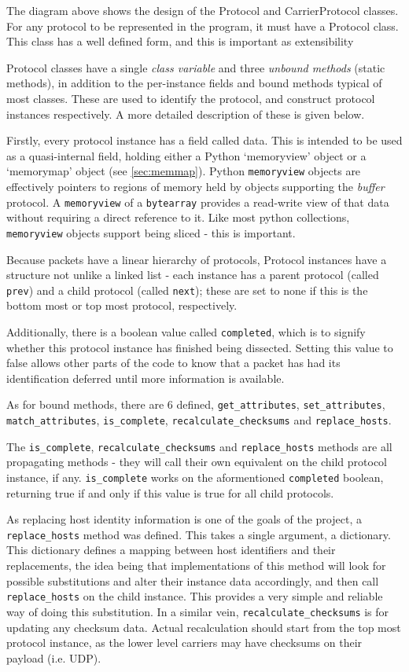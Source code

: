 \documentclass[10pt,a4paper,notitlepage,twoside]{report}
\begin{document}
The diagram above shows the design of the Protocol and CarrierProtocol classes. For any protocol to be represented in the program, it must have a Protocol class. This class has a well defined form, and this is important as extensibility 

Protocol classes have a single \emph{class variable} and three \emph{unbound methods} (static methods), in addition to the per-instance fields and bound methods typical of most classes. These are used to identify the protocol, and construct protocol instances respectively. A more detailed description of these is given below.

Firstly, every protocol instance has a field called data. This is intended to be used as a quasi-internal field, holding either a Python `memoryview' object or a `memorymap' object (see \ref{sec:memmap}). Python \texttt{memoryview} objects are effectively pointers to regions of memory held by objects supporting the \emph{buffer} protocol. A \texttt{memoryview} of a \texttt{bytearray} provides a read-write view of that data without requiring a direct reference to it. Like most python collections, \texttt{memoryview} objects support being sliced - this is important.

Because packets have a linear hierarchy of protocols, Protocol instances have a structure not unlike a linked list - each instance has a parent protocol (called \texttt{prev}) and a child protocol (called \texttt{next}); these are set to none if this is the bottom most or top most protocol, respectively.

Additionally, there is a boolean value called \texttt{completed}, which is to signify whether this protocol instance has finished being dissected. Setting this value to false allows other parts of the code to know that a packet has had its identification deferred until more information is available.

As for bound methods, there are 6 defined, \texttt{get_attributes}, \texttt{set_attributes}, \texttt{match_attributes}, \texttt{is_complete}, \texttt{recalculate_checksums} and \texttt{replace_hosts}.

The \texttt{is_complete}, \texttt{recalculate_checksums} and \texttt{replace_hosts} methods are all propagating methods - they will call their own equivalent on the child protocol instance, if any. \texttt{is_complete} works on the aformentioned \texttt{completed} boolean, returning true if and only if this value is true for all child protocols.

As replacing host identity information is one of the goals of the project, a \texttt{replace_hosts} method was defined. This takes a single argument, a dictionary. This dictionary defines a mapping between host identifiers and their replacements, the idea being that implementations of this method will look for possible substitutions and alter their instance data accordingly, and then call \texttt{replace_hosts} on the child instance. This provides a very simple and reliable way of doing this substitution. In a similar vein, \texttt{recalculate_checksums} is for updating any checksum data. Actual recalculation should start from the top most protocol instance, as the lower level carriers may have checksums on their payload (i.e. UDP).
\end{document}
